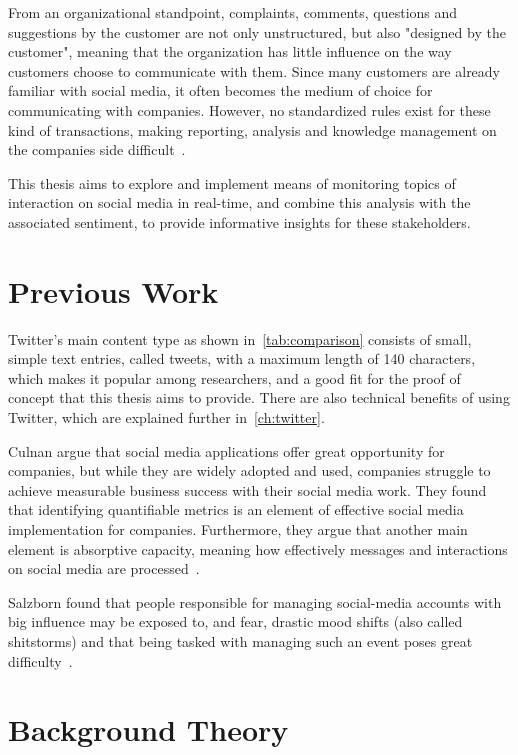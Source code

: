 From an organizational standpoint, complaints, comments, questions and suggestions by the customer are not only unstructured,
but also "designed by the customer", meaning that the organization has little influence on the way customers choose to communicate with them.
Since many customers are already familiar with social media, it often becomes the medium of choice for communicating with companies.
However, no standardized rules exist for these kind of transactions, making reporting, analysis and knowledge management on the companies side difficult~\cite{Culnan2015}.
\par
This thesis aims to explore and implement means of monitoring topics of interaction on social media in real-time,
and combine this analysis with the associated sentiment, to provide informative insights for these stakeholders.

\section{Previous Work}
\label{sec:previousWork}

Twitter's main content type as shown in~\autoref{tab:comparison} consists of small, simple text entries, called tweets, with a maximum length of 140 characters,
which makes it popular among researchers, and a good fit for the proof of concept that this thesis aims to provide.
There are also technical benefits of using Twitter, which are explained further in~\autoref{ch:twitter}.
\par
Culnan \etAl argue that social media applications offer great opportunity for companies,
but while they are widely adopted and used,
companies struggle to achieve measurable business success with their social media work.
They found that identifying quantifiable metrics is an element of effective social media implementation for companies.
Furthermore, they argue that another main element is absorptive capacity, meaning how effectively messages and
interactions on social media are processed~\cite{Culnan2015}.
\par
Salzborn \etAl found that people responsible for managing social-media accounts with big influence may be exposed to, and fear,
drastic mood shifts (also called shitstorms) and that being tasked with managing such an event poses great difficulty~\cite{Salzborn2015}.

\section{Background Theory}
\label{sec:backgroundTheory}

